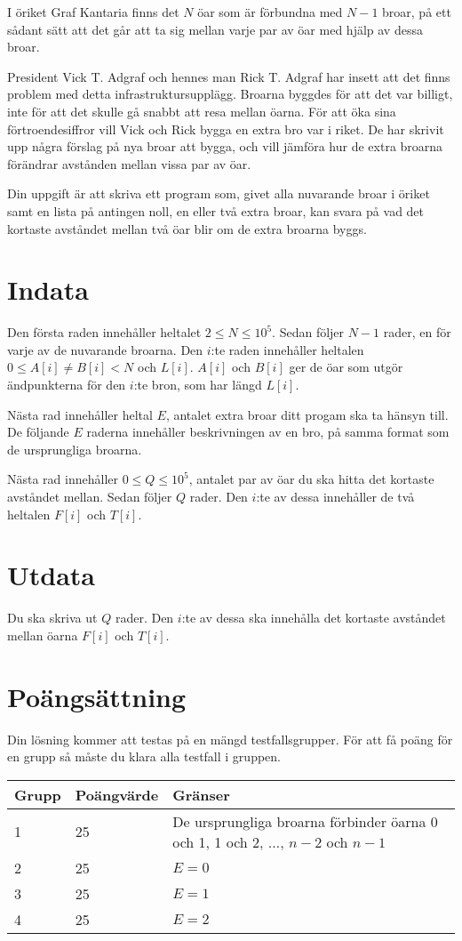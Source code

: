 I öriket Graf Kantaria finns det $N$ öar som är förbundna med $N - 1$ broar, på ett sådant sätt att det går att ta sig mellan varje par av öar med hjälp av dessa broar.

President Vick T. Adgraf och hennes man Rick T. Adgraf har insett att det finns problem med detta infrastruktursupplägg.
Broarna byggdes för att det var billigt, inte för att det skulle gå snabbt att resa mellan öarna.
För att öka sina förtroendesiffror vill Vick och Rick bygga en extra bro var i riket.
De har skrivit upp några förslag på nya broar att bygga, och vill jämföra hur de extra broarna förändrar avstånden mellan vissa par av öar.

Din uppgift är att skriva ett program som, givet alla nuvarande broar i öriket samt en lista på antingen noll, en eller två extra broar, kan svara på vad det kortaste avståndet mellan två öar blir om de extra broarna byggs.

\section*{Indata}
Den första raden innehåller heltalet $2 \le N \le 10^5$.
Sedan följer $N - 1$ rader, en för varje av de nuvarande broarna.
Den $i$:te raden innehåller heltalen $0 \le A[i] \not= B[i] < N$ och $L[i]$.
$A[i]$ och $B[i]$ ger de öar som utgör ändpunkterna för den $i$:te bron, som har längd $L[i]$.

Nästa rad innehåller heltal $E$, antalet extra broar ditt progam ska ta hänsyn till.
De följande $E$ raderna innehåller beskrivningen av en bro, på samma format som de ursprungliga broarna.

Nästa rad innehåller $0 \le Q \le 10^5$, antalet par av öar du ska hitta det kortaste avståndet mellan.
Sedan följer $Q$ rader.
Den $i$:te av dessa innehåller de två heltalen $F[i]$ och $T[i]$.

\section*{Utdata}
Du ska skriva ut $Q$ rader.
Den $i$:te av dessa ska innehålla det kortaste avståndet mellan öarna $F[i]$ och $T[i]$.

\section*{Poängsättning}
Din lösning kommer att testas på en mängd testfallsgrupper. För att få poäng för en grupp
så måste du klara alla testfall i gruppen.

\noindent
\begin{tabular}{| l | l | l |}
\hline
Grupp & Poängvärde & Gränser \\ \hline
	1     & 25         & De ursprungliga broarna förbinder öarna 0 och 1, 1 och 2, $\dots$, $n - 2$ och $n - 1$\\ \hline
	2     & 25         & $E = 0$ \\ \hline
	3     & 25         & $E = 1$ \\ \hline
	4     & 25         & $E = 2$ \\ \hline
\end{tabular}
